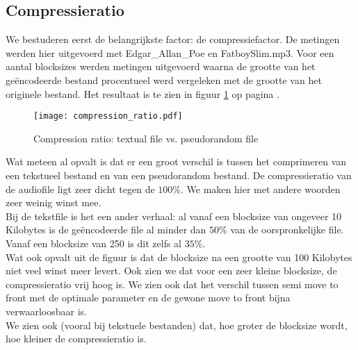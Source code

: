 \documentclass[11pt,a4paper]{article}
\begin{document}
\subsection{Compressieratio}
We bestuderen eerst de belangrijkste factor: de compressiefactor. De metingen werden hier uitgevoerd met Edgar\_Allan\_Poe en FatboySlim.mp3. Voor een aantal blocksizes werden metingen uitgevoerd waarna de grootte van het ge\"encodeerde bestand procentueel werd vergeleken met de grootte van het originele bestand. Het resultaat is te zien in figuur \ref{compr} op pagina \pageref{compr}.
\begin{figure}[h!]
  \centering
    \texttt{[image: compression\_ratio.pdf]}
    \caption{Compression ratio: textual file vs. pseudorandom file}
  \label{compr}
\end{figure}
Wat meteen al opvalt is dat er een groot verschil is tussen het comprimeren van een tekstueel bestand en van een pseudorandom bestand. De compressieratio van de audiofile ligt zeer dicht tegen de $100\%$. We maken hier met andere woorden zeer weinig winst mee.\\
Bij de tekstfile is het een ander verhaal: al vanaf een blocksize van ongeveer 10 Kilobytes is de ge\"encodeerde file al minder dan $50\%$ van de oorspronkelijke file. Vanaf een blocksize van 250 is dit zelfs al $35\%$.\\
Wat ook opvalt uit de figuur is dat de blocksize na een grootte van 100 Kilobytes niet veel winst meer levert. Ook zien we dat voor een zeer kleine blocksize, de compressieratio vrij hoog is.
We zien ook dat het verschil tussen semi move to front met de optimale parameter en de gewone move to front bijna verwaarloosbaar is.\\
We zien ook (vooral bij tekstuele bestanden) dat, hoe groter de blocksize wordt, hoe kleiner de compressieratio is.
\end{document}
